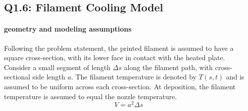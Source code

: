 \documentclass{article}
\begin{document}
\subsection*{Q1.6: Filament Cooling Model}
\paragraph{geometry and modeling assumptions}
Following the problem statement, the printed filament is assumed to have a square cross-section, with its lower face in contact with the heated plate. Consider a small segment of length $\Delta s$ along the filament path, with cross-sectional side length $a$. The filament temperature is denoted by $T(s,t)$ and is assumed to be uniform across each cross-section. At deposition, the filament temperature is assumed to equal the nozzle temperature.
\begin{equation}V=a^2\Delta s\end{equation}
\end{document}
